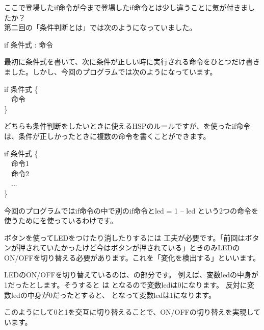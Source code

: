 ここで登場したif命令が今まで登場したif命令とは少し違うことに気が付きましたか？\\
第二回の「条件判断とは」では次のようになっていました。\\
\begin{center}
 					if 条件式 : 命令 \\
\end{center}
最初に条件式を書いて、次に条件が正しい時に実行される命令をひとつだけ書きました。しかし、今回のプログラムでは次のようになっています。\\
\begin{center}
  \begin{minipage}{4cm}
    if 条件式 \{\\ \ \ 命令\\ \}
  \end{minipage}
\end{center}
どちらも条件判断をしたいときに使えるHSPのルールですが、{}を使ったif命令は、条件が正しかったときに複数の命令を書くことができます。\\
\begin{center}
  \begin{minipage}{4cm}
					if 条件式 \{\\
					  \ \ 命令1\\
					  \ \ 命令2\\
					  \ \ ...\\
					\}\\
  \end{minipage}
\end{center}
今回のプログラムではif命令の中で別のif命令とled = 1 – led という2つの命令を使うために{}を使っているわけです。\\

\begin{center}

\end{center}

ボタンを使ってLEDをつけたり消したりするには 工夫が必要です。「前回はボタンが押されていたかったけど今はボタンが押されている」ときのみLEDのON/OFFを切り替える必要があります。これを「変化を検出する」といいます。

LEDのON/OFFを切り替えているのは、の部分です。
例えば、変数ledの中身が1だったとします。そうすると は となるので変数ledは0になります。
反対に変数ledの中身が0だったとすると、 となって変数ledは1になります。

このようにして0と1を交互に切り替えることで、ON/OFFの切り替えを実現しています。\\

\begin{tcolorbox}[title=\useOmetoi]
\label{button_led2_toi}
\begin{enumerate}
\end{enumerate}
\end{tcolorbox}
